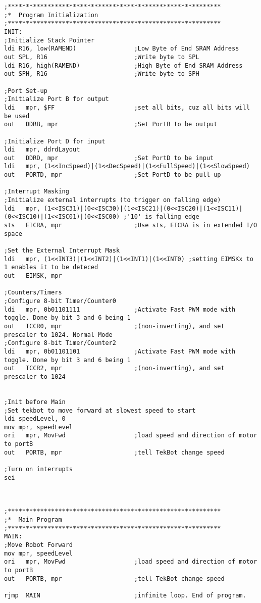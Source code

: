 \documentclass[12pt,letterpaper]{article}
\begin{document}
\begin{verbatim}
;***********************************************************
;*	Program Initialization
;***********************************************************
INIT:
;Initialize Stack Pointer
ldi R16, low(RAMEND) 				;Low Byte of End SRAM Address
out SPL, R16 						;Write byte to SPL
ldi R16, high(RAMEND) 				;High Byte of End SRAM Address
out SPH, R16 						;Write byte to SPH	

;Port Set-up
;Initialize Port B for output
ldi   mpr, $FF						;set all bits, cuz all bits will be used
out   DDRB, mpr         			;Set PortB to be output

;Initialize Port D for input
ldi   mpr, ddrdLayout
out   DDRD, mpr         			;Set PortD to be input
ldi   mpr, (1<<IncSpeed)|(1<<DecSpeed)|(1<<FullSpeed)|(1<<SlowSpeed)
out   PORTD, mpr        			;Set PortD to be pull-up 

;Interrupt Masking
;Initialize external interrupts (to trigger on falling edge)
ldi   mpr, (1<<ISC31)|(0<<ISC30)|(1<<ISC21)|(0<<ISC20)|(1<<ISC11)|(0<<ISC10)|(1<<ISC01)|(0<<ISC00) ;'10' is falling edge
sts   EICRA, mpr        			;Use sts, EICRA is in extended I/O space

;Set the External Interrupt Mask
ldi   mpr, (1<<INT3)|(1<<INT2)|(1<<INT1)|(1<<INT0) ;setting EIMSKx to 1 enables it to be deteced
out   EIMSK, mpr

;Counters/Timers
;Configure 8-bit Timer/Counter0
ldi   mpr, 0b01101111				;Activate Fast PWM mode with toggle. Done by bit 3 and 6 being 1
out   TCCR0, mpr 					;(non-inverting), and set prescaler to 1024. Normal Mode
;Configure 8-bit Timer/Counter2
ldi   mpr, 0b01101101				;Activate Fast PWM mode with toggle. Done by bit 3 and 6 being 1
out   TCCR2, mpr 					;(non-inverting), and set prescaler to 1024


;Init before Main
;Set tekbot to move forward at slowest speed to start
ldi speedLevel, 0
mov mpr, speedLevel
ori   mpr, MovFwd					;load speed and direction of motor to portB
out   PORTB, mpr					;tell TekBot change speed

;Turn on interrupts
sei



;***********************************************************
;*	Main Program
;***********************************************************
MAIN:
;Move Robot Forward
mov mpr, speedLevel
ori   mpr, MovFwd					;load speed and direction of motor to portB
out   PORTB, mpr					;tell TekBot change speed

rjmp  MAIN							;infinite loop. End of program.


\end{verbatim}
\end{document}
